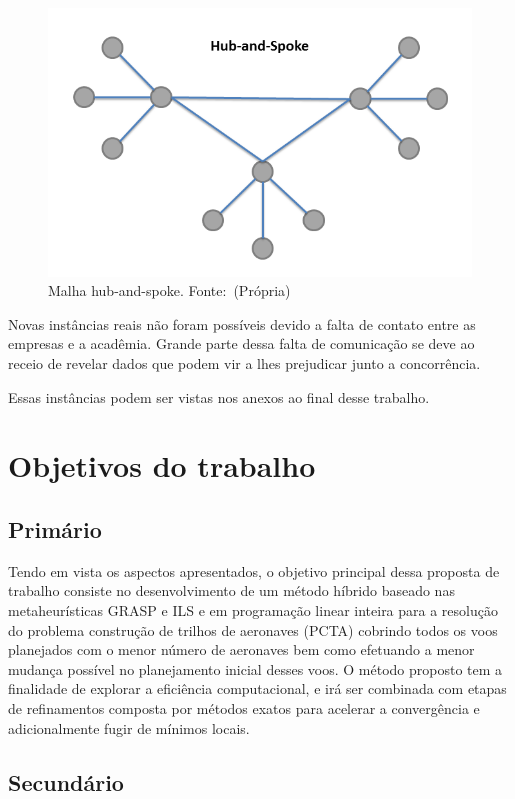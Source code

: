 \begin{figure}[ht]
\caption{Malha hub-and-spoke. \mbox{Fonte: (Própria)}}
\label{fig:hubandspoke}
\includegraphics[scale=0.35]{./img/hubandspoke}
\end{figure}
 	 	
	
Novas instâncias reais não foram possíveis devido a falta de contato entre as
empresas e a acadêmia. Grande parte dessa falta de comunicação se deve ao receio
de revelar dados que podem vir a lhes prejudicar junto a concorrência.

Essas instâncias podem ser vistas nos anexos ao final desse trabalho.


\section {Objetivos do trabalho}

\subsection{Primário}
Tendo em vista os aspectos apresentados, o objetivo principal dessa proposta de
trabalho consiste no desenvolvimento de um método híbrido baseado nas
metaheurísticas GRASP e ILS e em programação linear inteira para a resolução do
problema construção de trilhos de aeronaves (PCTA) cobrindo todos os voos
planejados com o menor número de aeronaves bem como efetuando a menor mudança
possível no planejamento inicial desses voos. O método proposto tem a finalidade
de explorar a eficiência computacional, e irá ser combinada com etapas de
refinamentos composta por métodos exatos para acelerar a convergência e
adicionalmente fugir de mínimos locais.

\subsection{Secundário}

